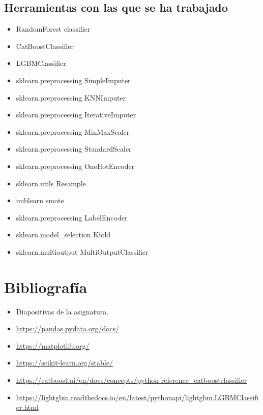 \documentclass[twoside,openright,titlepage,numbers=noenddot,openany,headinclude,footinclude=true,
cleardoublepage=empty,abstractoff,BCOR=5mm,paper=a4,fontsize=12pt,main=spanish]{scrreprt}
\begin{document}
\newpage
\section{Herramientas con las que se ha trabajado}

\begin{itemize}
\item RandomForest classifier
\item CatBoostClassifier
\item LGBMClassifier
\item sklearn.preprocessing SimpleImputer
\item sklearn.preprocessing KNNImputer
\item sklearn.preprocessing IterativeImputer
\item sklearn.preprocessing MinMaxScaler
\item sklearn.preprocessing StandardScaler
\item sklearn.preprocessing OneHotEncoder
\item sklearn.utils Resample
\item imblearn smote
\item sklearn.preprocessing LabelEncoder
\item sklearn.model\_selection Kfold
\item sklearn.multioutput MultiOutputClassifier


\end{itemize}





%
\newpage


\chapter{Bibliografía}
\begin{itemize}
\item Diapositivas de la asignatura.
\item \href{https://pandas.pydata.org/docs/}{https://pandas.pydata.org/docs/}
\item \href{https://matplotlib.org/}{https://matplotlib.org/}
\item \href{https://scikit-learn.org/stable/}{https://scikit-learn.org/stable/}
\item \href{https://catboost.ai/en/docs/concepts/python-reference\_catboostclassifier}{https://catboost.ai/en/docs/concepts/python-reference\_catboostclassifier}
\item \href{https://lightgbm.readthedocs.io/en/latest/pythonapi/lightgbm.LGBMClassifier.html}{https://lightgbm.readthedocs.io/en/latest/pythonapi/lightgbm.LGBMClassifier.html}
\end{itemize}


\end{document}
